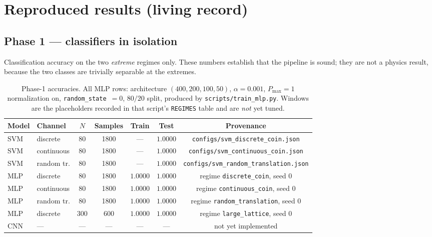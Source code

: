 \documentclass[11pt]{article}
\begin{document}
\section{Reproduced results (living record)}
\label{sec:reproduced}

\subsection{Phase 1 --- classifiers in isolation}

Classification accuracy on the two \emph{extreme} regimes only. These numbers
establish that the pipeline is sound; they are not a physics result, because
the two classes are trivially separable at the extremes.

\begin{table}[h]
\centering
\small
\begin{tabular}{llccccc}
\toprule
\textbf{Model} & \textbf{Channel} & $N$ & \textbf{Samples} & \textbf{Train} & \textbf{Test} & \textbf{Provenance} \\
\midrule
SVM & discrete    & 80 & 1800 & --- & $1.0000$ & \texttt{configs/svm\_discrete\_coin.json} \\
SVM & continuous  & 80 & 1800 & --- & $1.0000$ & \texttt{configs/svm\_continuous\_coin.json} \\
SVM & random tr.  & 80 & 1800 & --- & $1.0000$ & \texttt{configs/svm\_random\_translation.json} \\
MLP & discrete    & 80 & 1800 & $1.0000$ & $1.0000$ & regime \texttt{discrete\_coin}, seed 0 \\
MLP & continuous  & 80 & 1800 & $1.0000$ & $1.0000$ & regime \texttt{continuous\_coin}, seed 0 \\
MLP & random tr.  & 80 & 1800 & $1.0000$ & $1.0000$ & regime \texttt{random\_translation}, seed 0 \\
MLP & discrete    & 300 & 600 & $1.0000$ & $1.0000$ & regime \texttt{large\_lattice}, seed 0 \\
CNN & ---         & --- & --- & ---      & ---      & not yet implemented \\
\bottomrule
\end{tabular}
\caption{Phase-1 accuracies. All MLP rows: architecture $(400,200,100,50)$,
$\alpha=0.001$, $P_{\max}=1$ normalization on, \texttt{random\_state}~$=0$,
$80/20$ split, produced by \texttt{scripts/train\_mlp.py}. Windows are the
placeholders recorded in that script's \texttt{REGIMES} table and are
\emph{not} yet tuned.}
\label{tab:phase1}
\end{table}
\end{document}
